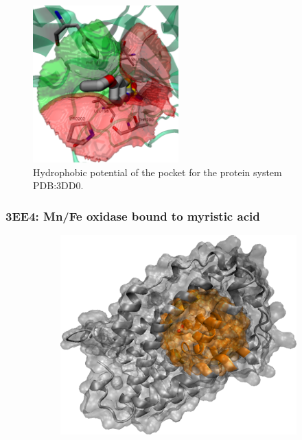       \begin{figure}[H]
        \centering
        \includegraphics[width=0.5\textwidth]{figures/results/benchmark_prot/3dd0.png}
        \caption{\label{fig:benchmark/3dd0} Hydrophobic potential of the pocket for the protein system PDB:3DD0.}
      \end{figure}
    \pagebreak

    \subsubsection{3EE4: Mn/Fe oxidase bound to myristic acid}
      \begin{figure}[H] \centering
        \begin{subfigure}[c]{0.3\textwidth} \centering
          \includegraphics[width=1\textwidth]{figures/results/ps_prot/3ee4.png}
        \end{subfigure}
        \begin{subfigure}[c]{0.3\textwidth} \centering
        \end{subfigure}
      \end{figure}

